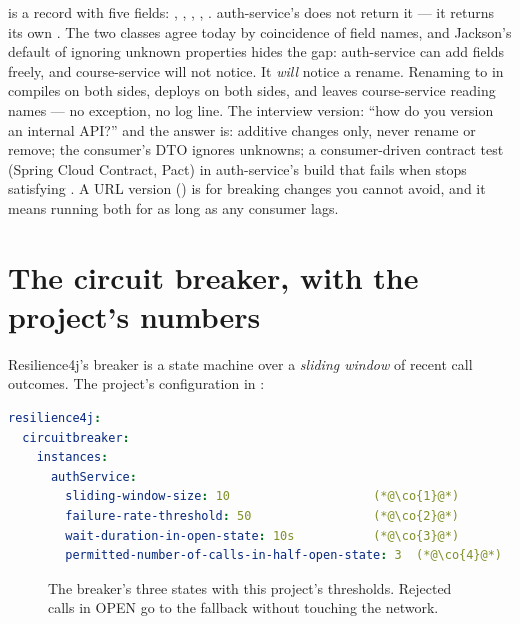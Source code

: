  is a record with five fields: , ,
, , . auth-service's
 does not return it --- it returns its own
. The two classes agree today by coincidence of
field names, and Jackson's default of ignoring unknown properties hides
the gap: auth-service can add fields freely, and course-service will not
notice. It \emph{will} notice a rename. Renaming  to
 in  compiles on both sides, deploys
on both sides, and leaves course-service reading  names ---
no exception, no log line. The interview version: ``how do you version
an internal API?'' and the answer is: additive changes only, never
rename or remove; the consumer's DTO ignores unknowns; a consumer-driven
contract test (Spring Cloud Contract, Pact) in auth-service's build that
fails when  stops satisfying . A URL
version () is for breaking changes you cannot avoid,
and it means running both for as long as any consumer lags.

\section{The circuit breaker, with the project's numbers}
\label{sec:cb-math}

Resilience4j's breaker is a state machine over a \emph{sliding window}
of recent call outcomes. The project's configuration in
:

\begin{lstlisting}[language=yaml]
resilience4j:
  circuitbreaker:
    instances:
      authService:
        sliding-window-size: 10                    (*@\co{1}@*)
        failure-rate-threshold: 50                 (*@\co{2}@*)
        wait-duration-in-open-state: 10s           (*@\co{3}@*)
        permitted-number-of-calls-in-half-open-state: 3  (*@\co{4}@*)
\end{lstlisting}

\begin{figure}[htb]
\centering
{}
\caption{The breaker's three states with this project's thresholds.
Rejected calls in OPEN go to the fallback without touching the network.}
\label{fig:cb-states}
\end{figure}

